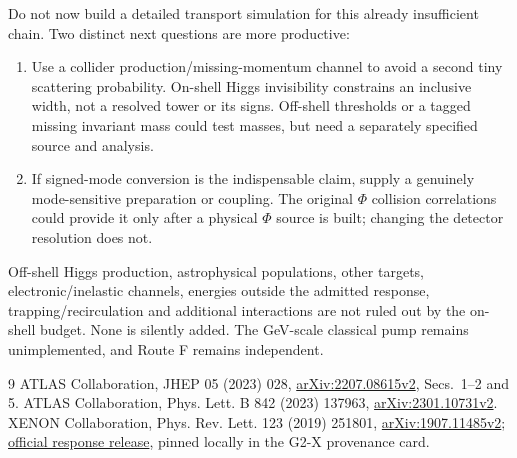 \documentclass[11pt,a4paper]{article}
\begin{document}
Do not now build a detailed transport simulation for this already
insufficient chain. Two distinct next questions are more productive:
\begin{enumerate}
 \item Use a collider production/missing-momentum channel to avoid
 a second tiny scattering probability. On-shell Higgs invisibility
 constrains an inclusive width, not a resolved tower or its signs.
 Off-shell thresholds or a tagged missing invariant mass could test
 masses, but need a separately specified source and analysis.
 \item If signed-mode conversion is the indispensable claim, supply
 a genuinely mode-sensitive preparation or coupling. The original
 $\Phi$ collision correlations could provide it only after a physical
 $\Phi$ source is built; changing the detector resolution does not.
\end{enumerate}
Off-shell Higgs production, astrophysical populations, other targets,
electronic/inelastic channels, energies outside the admitted response,
trapping/recirculation and additional interactions are not ruled out
by the on-shell budget. None is silently added. The GeV-scale
classical pump remains unimplemented, and Route F remains independent.

\begin{thebibliography}{9}
 ATLAS Collaboration, JHEP 05 (2023) 028,
\href{https://arxiv.org/html/2207.08615v2}{arXiv:2207.08615v2},
Secs.~1--2 and 5.
 ATLAS Collaboration, Phys. Lett. B 842 (2023) 137963,
\href{https://arxiv.org/abs/2301.10731v2}{arXiv:2301.10731v2}.
 XENON Collaboration, Phys. Rev. Lett. 123 (2019) 251801,
\href{https://arxiv.org/html/1907.11485v2}{arXiv:1907.11485v2};
\href{https://github.com/XENON1T/s2only_data_release}{official response release},
pinned locally in the G2-X provenance card.
\end{thebibliography}
\end{document}
